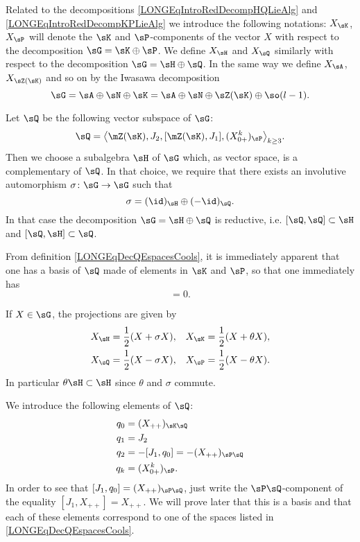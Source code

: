 Related to the decompositions \eqref{LONGEqIntroRedDecompHQLieAlg} and \eqref{LONGEqIntroRedDecompKPLieAlg} we introduce the following notations: $X_{\sK}$, $X_{\sP}$ will denote the $\sK$ and $\sP$-components of the vector $X$ with respect to the decomposition $\sG=\sK\oplus\sP$. We define $X_{\sH}$ and $X_{\sQ}$ similarly with respect to the decomposition $\sG=\sH\oplus\sQ$. In the same way we define $X_{\sA}$, $X_{\sZ(\sK)}$ and so on by the Iwasawa decomposition
\begin{equation}
    \sG=\sA\oplus\sN\oplus\sK=\sA\oplus\sN\oplus\sZ(\sK)\oplus\so(l-1).
\end{equation}

Let $\sQ$ be the following vector subspace of $\sG$:
\begin{equation}		\label{LONGEqDecQEspacesCools}	%
	\sQ=\big\langle \mZ(\sK),J_2,[\mZ(\sK),J_1],(X_{0+}^k)_\sP\big\rangle_{k\geq 3}.
\end{equation}
Then we choose a subalgebra $\sH$ of $\sG$ which, as vector space, is a complementary of $\sQ$. In that choice, we require that there exists an involutive automorphism $\sigma\colon \sG\to \sG$ such that
\begin{equation}
	\sigma=(\id)_{\sH}\oplus(-\id)_{\sQ}.
\end{equation}
In that case the decomposition $\sG=\sH\oplus\sQ$ is reductive, i.e. $[\sQ,\sQ]\subset\sH$ and $[\sQ,\sH]\subset\sQ$.




From definition \eqref{LONGEqDecQEspacesCools}, it is immediately apparent that one has a basis of $\sQ$ made of elements in $\sK$ and $\sP$, so that one immediately has
\begin{equation}
	[\sigma,\theta]=0.
\end{equation}

If $X\in\sG$, the projections are given by
\begin{equation}		\label{LONGEqProjHQPKsigmatheta}
	\begin{aligned}[]
		X_{\sH}&=\frac{ 1 }{2}(X+\sigma X),		&X_{\sK}&=\frac{ 1 }{2}(X+\theta X),\\
		X_{\sQ}&=\frac{ 1 }{2}(X-\sigma X),		&X_{\sP}&=\frac{ 1 }{2}(X-\theta X).
	\end{aligned}
\end{equation}
In particular $\theta\sH\subset\sH$ since $\theta$ and $\sigma$ commute.

We introduce the following elements of $\sQ$:
\begin{equation}			\label{LONGAlignPRedDefQQ}
	\begin{aligned}[]
		q_0&=(X_{++})_{\sK\sQ}\\
		q_1&=J_2\\
		q_2&=-[J_1,q_0]=-(X_{++})_{\sP\sQ}\\
		q_k&=(X^k_{0+})_{\sP}.
	\end{aligned}
\end{equation}
In order to see that $[J_1,q_0]=(X_{++})_{\sP\sQ}$, just write the $\sP\sQ$-component of the equality $[J_1,X_{++}]=X_{++}$. We will prove later that this is a basis and that each of these elements correspond to one of the spaces listed in \eqref{LONGEqDecQEspacesCools}.

